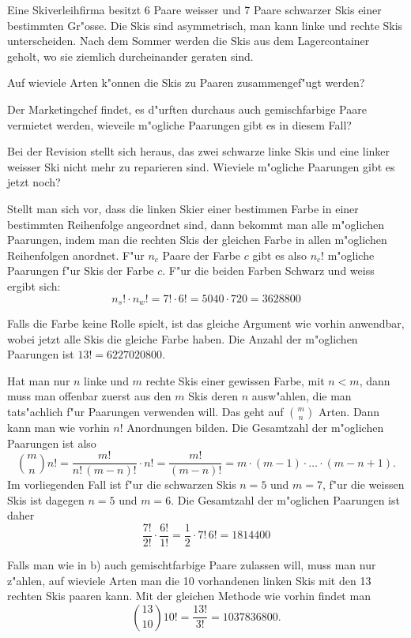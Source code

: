 Eine Skiverleihfirma besitzt 6 Paare weisser und 7 Paare schwarzer Skis
einer bestimmten Gr"osse. Die Skis sind asymmetrisch, man kann linke
und rechte Skis unterscheiden.
Nach dem Sommer werden die Skis aus dem Lagercontainer geholt, 
wo sie ziemlich durcheinander geraten sind.
\begin{teilaufgaben}
\item Auf wieviele Arten k"onnen die Skis zu Paaren zusammengef"ugt werden?
\item Der Marketingchef findet, es d"urften durchaus auch gemischfarbige Paare
vermietet werden, wieveile m"ogliche Paarungen gibt es in diesem
Fall?
\item Bei der Revision stellt sich heraus, das zwei schwarze linke Skis
und eine linker weisser Ski nicht mehr zu reparieren sind. Wieviele
m"ogliche Paarungen gibt es jetzt noch?
\end{teilaufgaben}

\begin{loesung}
\begin{teilaufgaben}
\item Stellt man sich vor, dass die linken Skier einer bestimmen
Farbe in einer bestimmten
Reihenfolge angeordnet sind, dann bekommt man alle m"oglichen Paarungen,
indem man die rechten Skis der gleichen Farbe in allen m"oglichen
Reihenfolgen anordnet.
F"ur $n_c$ Paare der Farbe $c$ gibt es also $n_c!$ m"ogliche
Paarungen f"ur Skis der Farbe $c$. F"ur die beiden Farben Schwarz
und weiss ergibt sich:
\[
n_s!\cdot n_w!=7!\cdot 6!=5040\cdot 720=3628800
\]
\item
Falls die Farbe keine Rolle spielt, ist das gleiche Argument wie vorhin
anwendbar, wobei jetzt alle Skis die gleiche Farbe haben. Die Anzahl
der m"oglichen Paarungen ist $13!=6227020800$.
\item
Hat man nur $n$ linke und $m$ rechte Skis einer gewissen Farbe, mit $n<m$,
dann muss man offenbar zuerst aus den $m$ Skis deren $n$ ausw"ahlen,
die man tats"achlich f"ur Paarungen verwenden will. Das geht auf $\binom{m}{n}$
Arten. Dann kann man wie vorhin $n!$ Anordnungen bilden. Die Gesamtzahl
der m"oglichen Paarungen ist also 
\[
\binom{m}{n}n!=\frac{m!}{n!\,(m-n)!}\cdot n!=\frac{m!}{(m-n)!}
=
m\cdot(m-1)\cdot\dots\cdot(m-n+1).
\]
Im vorliegenden Fall ist f"ur die schwarzen Skis $n=5$ und $m=7$,
f"ur die weissen Skis ist dagegen $n=5$ und $m=6$.
Die Gesamtzahl der m"oglichen Paarungen ist daher
\[
\frac{7!}{2!}\cdot \frac{6!}{1!}
=\frac12\cdot 7!\,6!=1814400
\]
\end{teilaufgaben}
Falls man wie in b) auch gemischtfarbige Paare zulassen will, muss
man nur z"ahlen, auf wieviele Arten man die 10 vorhandenen
linken Skis mit den 13 rechten Skis paaren kann. Mit der gleichen
Methode wie vorhin findet man
\[
\binom{13}{10}10!=\frac{13!}{3!}=1037836800.
\]
\end{loesung}

